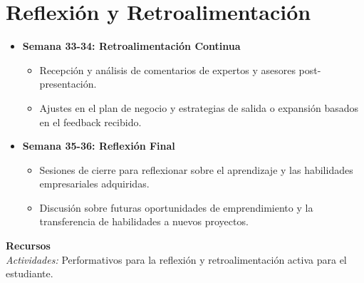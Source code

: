 \newpage
\section{Reflexión y Retroalimentación}
\begin{itemize}
  \item \textbf{Semana 33-34: Retroalimentación Continua}
  \begin{itemize}
    \item Recepción y análisis de comentarios de expertos y asesores post-presentación.
    \item Ajustes en el plan de negocio y estrategias de salida o expansión basados en el feedback recibido.
  \end{itemize}
  \item \textbf{Semana 35-36: Reflexión Final}
  \begin{itemize}
    \item Sesiones de cierre para reflexionar sobre el aprendizaje y las habilidades empresariales adquiridas.
    \item Discusión sobre futuras oportunidades de emprendimiento y la transferencia de habilidades a nuevos proyectos.
  \end{itemize}
\end{itemize}

{\large \textbf{Recursos}}\\
\textit{Actividades: } Performativos para la reflexión y retroalimentación activa para el estudiante.  


